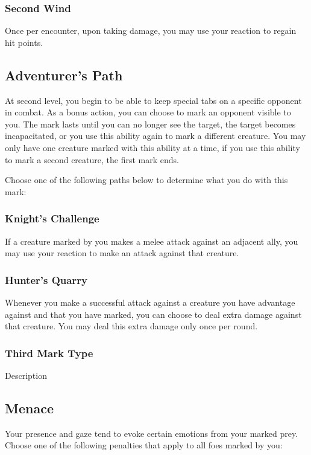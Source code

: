 \subsubsection{Second Wind}
Once per encounter, upon taking damage, you may use your reaction to regain hit points.

\vspace{.1 in}

\subsection*{Adventurer's Path}
At second level, you begin to be able to keep special tabs on a specific opponent in combat. As a bonus action, you can choose to mark an opponent visible to you. The mark lasts until you can no longer see the target, the target becomes incapacitated, or you use this ability again to mark a different creature. You may only have one creature marked with this ability at a time, if you use this ability to mark a second creature, the first mark ends. 

Choose one of the following paths below to determine what you do with this mark:

\subsubsection{Knight's Challenge}
If a creature marked by you makes a melee attack against an adjacent ally, you may use your reaction to make an attack against that creature.

\subsubsection{Hunter's Quarry}
Whenever you make a successful attack against a creature you have advantage against and that you have marked, you can choose to deal extra damage against that creature. You may deal this extra damage only once per round.

\subsubsection{Third Mark Type}
Description

\vspace{.1 in}

\subsection*{Menace}
Your presence and gaze tend to evoke certain emotions from your marked prey. Choose one of the following penalties that apply to all foes marked by you:

